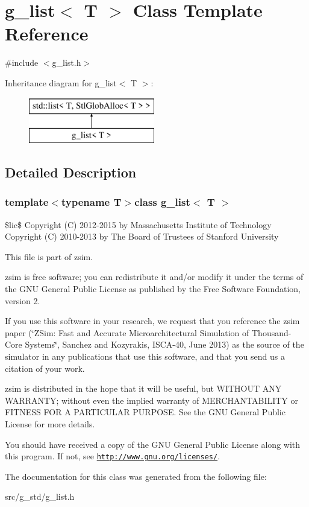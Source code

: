 \hypertarget{classg__list}{\section{g\-\_\-list$<$ T $>$ Class Template Reference}
\label{classg__list}
}


{\ttfamily \#include $<$g\-\_\-list.\-h$>$}

Inheritance diagram for g\-\_\-list$<$ T $>$\-:\begin{figure}[H]
\begin{center}
\leavevmode
\includegraphics[height=2.000000cm]{classg__list}
\end{center}
\end{figure}


\subsection{Detailed Description}
\subsubsection*{template$<$typename T$>$class g\-\_\-list$<$ T $>$}

\$lic\$ Copyright (C) 2012-\/2015 by Massachusetts Institute of Technology Copyright (C) 2010-\/2013 by The Board of Trustees of Stanford University

This file is part of zsim.

zsim is free software; you can redistribute it and/or modify it under the terms of the G\-N\-U General Public License as published by the Free Software Foundation, version 2.

If you use this software in your research, we request that you reference the zsim paper (\char`\"{}\-Z\-Sim\-: Fast and Accurate Microarchitectural Simulation of
\-Thousand-\/\-Core Systems\char`\"{}, Sanchez and Kozyrakis, I\-S\-C\-A-\/40, June 2013) as the source of the simulator in any publications that use this software, and that you send us a citation of your work.

zsim is distributed in the hope that it will be useful, but W\-I\-T\-H\-O\-U\-T A\-N\-Y W\-A\-R\-R\-A\-N\-T\-Y; without even the implied warranty of M\-E\-R\-C\-H\-A\-N\-T\-A\-B\-I\-L\-I\-T\-Y or F\-I\-T\-N\-E\-S\-S F\-O\-R A P\-A\-R\-T\-I\-C\-U\-L\-A\-R P\-U\-R\-P\-O\-S\-E. See the G\-N\-U General Public License for more details.

You should have received a copy of the G\-N\-U General Public License along with this program. If not, see \href{http://www.gnu.org/licenses/}{\tt http\-://www.\-gnu.\-org/licenses/}. 

The documentation for this class was generated from the following file\-:\begin{DoxyCompactItemize}
\item 
src/g\-\_\-std/g\-\_\-list.\-h\end{DoxyCompactItemize}
